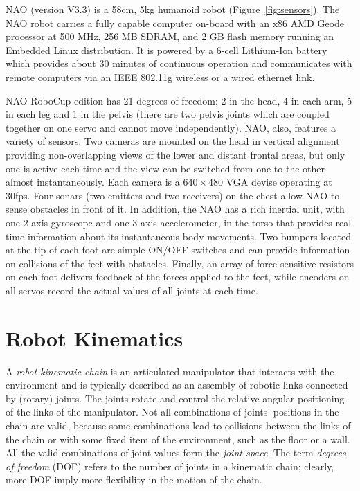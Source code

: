 NAO (version V3.3) is a 58cm, 5kg humanoid robot (Figure~\ref{fig:sensors}). The NAO robot carries a fully capable computer on-board with an x86 AMD Geode processor at 500 MHz, 256 MB SDRAM, and 2 GB flash memory running an Embedded Linux distribution. It is powered by a 6-cell Lithium-Ion battery which provides about 30 minutes of continuous operation and communicates with remote computers via an IEEE 802.11g wireless or a wired ethernet link. 

NAO RoboCup edition has 21 degrees of freedom; 2 in the head, 4 in each arm, 5 in each leg and 1 in the pelvis (there are two pelvis joints which are coupled together on one servo and cannot move independently). NAO, also, features a variety of sensors. Two cameras are mounted on the head in vertical alignment providing non-overlapping views of the lower and distant frontal areas, but only one is active each time and the view can be switched from one to the other almost instantaneously. Each camera is a $640 \times 480$ VGA devise operating at 30fps. Four sonars (two emitters and two receivers) on the chest allow NAO to sense obstacles in front of it. In addition, the NAO has a rich inertial unit, with one 2-axis gyroscope and one 3-axis accelerometer, in the torso that provides real-time information about its instantaneous body movements. Two bumpers located at the tip of each foot are simple ON/OFF switches and can provide information on collisions of the feet with obstacles. Finally, an array of force sensitive resistors on each foot delivers feedback of the forces applied to the feet, while encoders on all servos record the actual values of all joints at each time.



\section{Robot Kinematics}
A \textit{robot kinematic chain} is an articulated manipulator that interacts with the environment and is typically described as an assembly of robotic links connected by (rotary) joints. The joints rotate and control the relative angular positioning of the links of the manipulator. Not all combinations of joints' positions in the chain are valid, because some combinations lead to collisions between the links of the chain or with some fixed item of the environment, such as the floor or a wall. All the valid combinations of joint values form the \textit{joint space}. The term \textit{degrees of freedom} (DOF) refers to the number of joints in a kinematic chain; clearly, more DOF imply more flexibility in the motion of the chain. 

